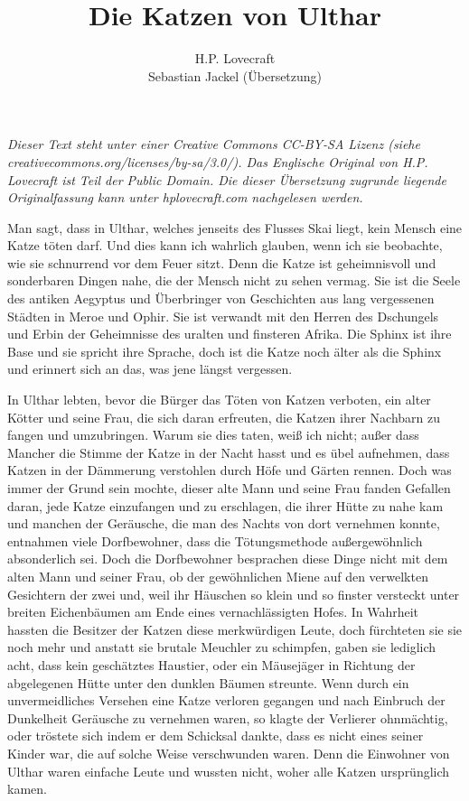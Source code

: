\documentclass[a4paper]{memoir}
\begin{document}
\title{Die Katzen von Ulthar}
\author{H.P. Lovecraft\\
		Sebastian Jackel (Übersetzung)}
\date{}
\maketitle

\textit{Dieser Text steht unter einer Creative Commons CC-BY-SA Lizenz
(siehe\\ creativecommons.org/licenses/by-sa/3.0/). Das Englische Original von H.P. Lovecraft ist Teil der Public Domain. Die dieser Übersetzung zugrunde liegende Originalfassung kann unter hplovecraft.com nachgelesen werden.}

\vspace{12pt}

Man sagt, dass in Ulthar, welches jenseits des Flusses Skai liegt, kein Mensch eine Katze töten darf. Und dies kann ich wahrlich glauben, wenn ich sie beobachte, wie sie schnurrend vor dem Feuer sitzt. Denn die Katze ist geheimnisvoll und sonderbaren Dingen nahe, die der Mensch nicht zu sehen vermag. Sie ist die Seele des antiken Aegyptus und Überbringer von Geschichten aus lang vergessenen Städten in Meroe und Ophir. Sie ist verwandt mit den Herren des Dschungels und Erbin der  Geheimnisse des uralten und finsteren Afrika. Die Sphinx ist ihre Base und sie spricht ihre Sprache, doch ist die Katze noch älter als die Sphinx und erinnert sich an das, was jene längst vergessen.

In Ulthar lebten, bevor die Bürger das Töten von Katzen verboten, ein alter Kötter und seine Frau, die sich daran erfreuten, die Katzen ihrer Nachbarn zu fangen und umzubringen. Warum sie dies taten, weiß ich nicht; außer dass Mancher die Stimme der Katze in der Nacht hasst und es übel aufnehmen, dass Katzen in der Dämmerung verstohlen durch Höfe und Gärten rennen. Doch was immer der Grund sein mochte, dieser alte Mann und seine Frau fanden Gefallen daran, jede Katze einzufangen und zu erschlagen, die ihrer Hütte zu nahe kam und manchen der Geräusche, die man des Nachts von dort vernehmen konnte, entnahmen viele Dorfbewohner, dass die Tötungsmethode außergewöhnlich absonderlich sei. Doch die Dorfbewohner besprachen diese Dinge nicht  mit dem alten Mann und seiner Frau, ob der gewöhnlichen Miene auf den verwelkten Gesichtern der zwei und, weil ihr Häuschen so klein und so finster versteckt unter breiten Eichenbäumen am Ende eines vernachlässigten Hofes. In Wahrheit hassten die Besitzer der Katzen diese merkwürdigen Leute, doch fürchteten sie sie noch mehr und anstatt sie brutale Meuchler zu schimpfen, gaben sie lediglich acht, dass kein geschätztes Haustier, oder ein Mäusejäger in Richtung der abgelegenen Hütte unter den dunklen Bäumen streunte. Wenn durch ein unvermeidliches Versehen eine Katze verloren gegangen und nach Einbruch der Dunkelheit Geräusche zu vernehmen waren, so klagte der Verlierer ohnmächtig, oder tröstete sich indem er dem Schicksal dankte, dass es nicht eines seiner Kinder war, die auf solche Weise verschwunden waren. Denn die Einwohner von Ulthar waren einfache Leute und wussten nicht, woher alle Katzen ursprünglich kamen.
\end{document}
